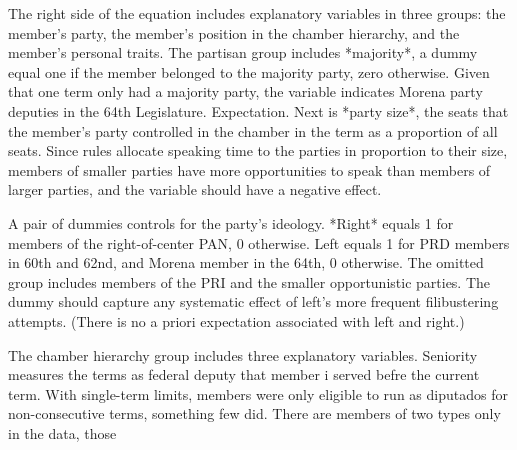\documentclass[letter,12pt]{article}
\begin{document}
The right side of the equation includes explanatory variables in three groups: the member's party, the member's position in the chamber hierarchy, and the member's personal traits. The partisan group includes *majority*, a dummy equal one if the member belonged to the majority party, zero otherwise. Given that one term only had a majority party, the variable indicates Morena party deputies in the 64th Legislature. Expectation. Next is *party size*, the seats that the member's party controlled in the chamber in the term as a proportion of all seats. Since rules allocate speaking time to the parties in proportion to their size, members of smaller parties have more opportunities to speak than  members of larger parties, and the variable should have a negative effect.

A pair of dummies controls for the party's ideology. *Right* equals 1 for members of the right-of-center PAN, 0 otherwise. Left equals 1 for PRD members in 60th and 62nd, and Morena member in the 64th, 0 otherwise. The omitted group includes members of the PRI and the smaller opportunistic parties. The dummy should capture any systematic effect of left's more frequent filibustering attempts. (There is no a priori expectation associated with left and right.)

The chamber hierarchy group includes three explanatory variables. Seniority measures the terms as federal deputy that member i served befre the current term. With single-term limits, members were only eligible to run as diputados for non-consecutive terms, something few did. There are members of two types only in the data, those  
\end{document}
